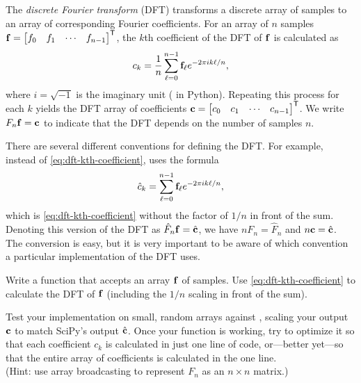 The \emph{discrete Fourier transform} (DFT) transforms a discrete array of samples to an array of corresponding Fourier coefficients.
For an array of $n$ samples $\mathbf{f} = \begin{bmatrix}f_0 & f_1 & \cdots & f_{n-1}\end{bmatrix}^{\mathsf T}$, the $k$th coefficient of the DFT of $\mathbf{f}$ is calculated as
\begin{align}
\label{eq:dft-kth-coefficient}
c_k = \frac{1}{n}\sum_{\ell=0}^{n-1} \mathbf{f}_\ell e^{-2\pi i k \ell / n},
\end{align}
where $i = \sqrt{-1}$ is the imaginary unit ( in Python).
Repeating this process for each $k$ yields the DFT array of coefficients $\mathbf{c} = \begin{bmatrix}c_0 & c_1 & \cdots & c_{n-1}\end{bmatrix}^{\mathsf T}$.
We write $F_n\mathbf{f} = \mathbf{c}$ to indicate that the DFT depends on the number of samples $n$.

\begin{warn}
There are several different conventions for defining the DFT.
For example, instead of \eqref{eq:dft-kth-coefficient},  uses the formula
\begin{align*}
\hat{c}_k = \sum_{\ell=0}^{n-1} \mathbf{f}_\ell e^{-2\pi i k \ell / n},
\end{align*}
which is \eqref{eq:dft-kth-coefficient} without the factor of $1/n$ in front of the sum.
Denoting this version of the DFT as $\hat{F}_n\mathbf{f} = \hat{\mathbf{c}}$, we have $nF_n = \hat{F}_n$ and $n\mathbf{c} = \hat{\mathbf{c}}$.
The conversion is easy, but it is very important to be aware of which convention a particular implementation of the DFT uses.
\end{warn}

\begin{problem} %
Write a function that accepts an array $\mathbf{f}$ of samples.
Use \eqref{eq:dft-kth-coefficient} to calculate the DFT of $\mathbf{f}$ (including the $1/n$ scaling in front of the sum).

Test your implementation on small, random arrays against , scaling your output $\mathbf{c}$ to match SciPy's output $\hat{\mathbf{c}}$. %
Once your function is working, try to optimize it so that each coefficient $c_k$ is calculated in just one line of code, or---better yet---so that the entire array of coefficients is calculated in the one line.
\\(Hint: use array broadcasting to represent $F_n$ as an $n\times n$ matrix.)
\label{prob:dft-naive}
\end{problem}

